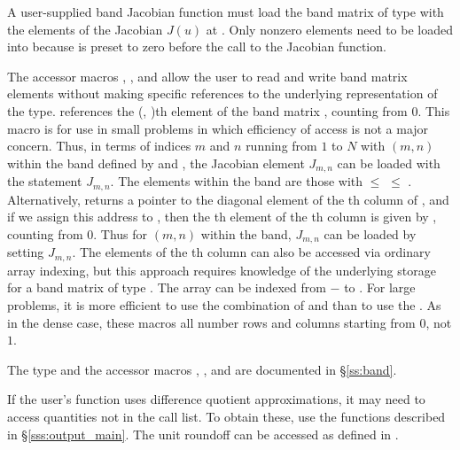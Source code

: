 {
  A user-supplied band Jacobian function must load the band matrix 
  of type  with the elements of the Jacobian $J(u)$ at .
  Only nonzero elements need to be loaded into
   because  is preset to zero before the call to the
  Jacobian function.  

  The accessor macros , , and  
  allow the user to read and write band matrix elements without making specific 
  references to the underlying representation of the  type.
   references the (, )th element of the 
  band matrix , counting from $0$.
  This macro is for use in small problems in which efficiency of access is not
  a major concern.  Thus, in terms of indices $m$ and $n$ running from $1$ to
  $N$ with $(m,n)$ within the band defined by  and
  , the Jacobian element $J_{m,n}$ can be loaded with the 
  statement  $J_{m,n}$. The elements within
  the band are those with  $\le$  $\le$ .
  Alternatively,  returns a pointer to the diagonal element
  of the th column of , and if we assign this address to 
  , then the th element of the th column is
  given by , counting from $0$.
  Thus for $(m,n)$ within the band, $J_{m,n}$ can be loaded by setting 
   
  $J_{m,n}$.  The elements of the th column can also be accessed
  via ordinary array indexing, but this approach requires knowledge of
  the underlying storage for a band matrix of type .  
  The array  can be indexed from $-$ to .
  For large problems, it is more efficient to use the combination of
   and  than to use the
  .  As in the dense case, these macros all number rows
  and columns starting from $0$, not $1$.  

  The  type and the accessor macros , ,
  and  are documented in \S\ref{ss:band}.

  If the user's  function uses difference quotient approximations,
  it may need to access quantities not in the call list. To obtain these, use the
   functions described in \S\ref{sss:output_main}. The unit roundoff
  can be accessed as  defined in .
}

